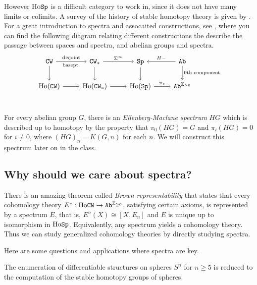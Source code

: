 \documentclass{article}[11pt]
\begin{document}
However $\text{Ho}\texttt{Sp}$ is a difficult category to work in, since it does not have many limits or colimits. A survey of the history of stable homotopy theory is given by \cite{May-history}. For a great introduction to spectra and assocaited constructions, see \cite{Cary-stable}, where you can find the following diagram relating different constructions the describe the passage between spaces and spectra, and abelian groups and spectra.
\[
	\begin{tikzcd}
	\CW\dar\rar["\text{disjoint}" above, "\text{basept.}" below] & \CW_\ast\dar \rar["\Sigma^\infty"] & \Sp\dar & \Ab\lar["H-"above]\dar["\text{0th component}"]\\
	\Ho(\CW)\rar & \Ho(\CW_\ast)\rar & \Ho(\Sp)\rar["\pi_\ast"] & \Ab^{\Z_{\geq 0}} \\
	\end{tikzcd}
\]


For every abelian group $G$, there is an \textit{Eilenberg-Maclane spectrum} $HG$ which is described up to homotopy by the property that $\pi_0(HG) = G$ and $\pi_i(HG) = 0$ for $i\neq 0$, where $(HG)_n = K(G,n)$ for each $n$. We will construct this spectrum later on in the class.

\subsection{Why should we care about spectra?}
There is an amazing theorem called \textit{Brown representability} that states that every cohomology theory $E^\ast : \text{Ho}\texttt{CW} \to \texttt{Ab}^{\mathbb{Z}_{\geq 0}}$, satisfying certain axioms, is represented by a spectrum $E$, that is, $E^n(X) \cong [X,E_n]$ and $E$ is unique up to isomorphism in $\text{Ho}\texttt{Sp}$. Equivalently, any spectrum yields a cohomology theory. Thus we can study generalized cohomology theories by directly studying spectra. 

Here are some questions and applications where spectra are key.

\begin{example} The enumeration of differentiable structures on spheres $S^n$ for $n\geq 5$ is reduced to the computation of the stable homotopy groups of spheres.
\end{example}
	
\end{document}
